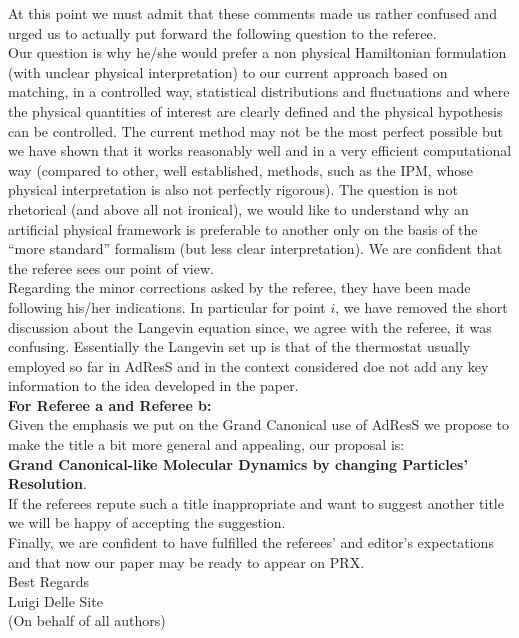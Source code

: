 \documentclass[12pt,a4paper]{article}
\begin{document}
At this point we must admit that these comments made us rather confused and urged us to actually put forward the following question to the referee.\\
Our question is why he/she would prefer a non physical Hamiltonian formulation (with unclear physical interpretation) to our current approach based on matching, in a controlled way, statistical distributions and fluctuations and where the physical quantities of interest are clearly defined and the physical hypothesis can be controlled. The current method may not be the most perfect possible but we have shown that it works reasonably well and in a very efficient computational way (compared to other, well established, methods, such as the {IPM}, whose physical interpretation is also not perfectly rigorous). The question is not rhetorical (and above all not ironical), we would like to understand why an artificial physical framework is preferable to another only on the basis of the ``more standard'' formalism (but less clear interpretation). We are confident that the referee sees our point of view.\\


Regarding the minor corrections asked by the referee, they have been made following his/her indications.
In particular for point $i$, we have removed the short discussion about the Langevin equation since, we agree with the referee, it was confusing.
Essentially the Langevin set up is that of the thermostat usually employed so far in AdResS and in the context considered doe not add any key information to the idea developed in the paper.
\\



{\bf For Referee a and Referee b:}\\
Given the emphasis we put on the Grand Canonical use of AdResS we propose to make the title a bit more general and appealing, our proposal is:\\
{\bf Grand Canonical-like Molecular Dynamics by changing Particles' Resolution}.\\
If the referees repute such a title inappropriate and want to suggest another title we will be happy of accepting the suggestion.\\


Finally, we are confident to have fulfilled the referees' and editor's expectations and that now our paper may be ready to appear on PRX.\\


Best Regards\\



Luigi Delle Site\\
(On behalf of all authors)\\
\end{document}
